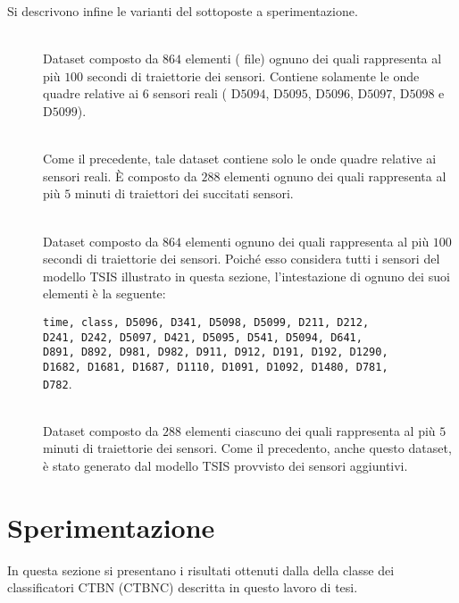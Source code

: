 Si descrivono infine le varianti del  sottoposte a sperimentazione.
\begin{description}
	\item[] \hfill \\
	Dataset composto da $864$ elementi (\ie{} file) ognuno dei quali rappresenta al più $100$ secondi di traiettorie dei sensori. Contiene solamente le onde quadre relative ai $6$ sensori reali (\ie{} D$5094$, D$5095$, D$5096$, D$5097$, D$5098$ e D$5099$).
	\item[] \hfill \\
	Come il precedente, tale dataset contiene solo le onde quadre relative ai sensori reali. \`E composto da $288$ elementi ognuno dei quali rappresenta al più $5$ minuti di traiettori dei succitati sensori.
	\item[] \hfill \\
	Dataset composto da $864$ elementi ognuno dei quali rappresenta al più $100$ secondi di traiettorie dei sensori. Poiché esso considera tutti i sensori del modello \acs{TSIS} illustrato in questa sezione, l'intestazione di ognuno dei suoi elementi è la seguente:\par
	\lstinline[]|time, class, D5096, D341, D5098, D5099, D211, D212, |\\\lstinline[]|D241, D242, D5097, D421, D5095, D541, D5094, D641, |\\\lstinline[]|D891, D892, D981, D982, D911, D912, D191, D192, D1290, |\\\lstinline[]|D1682, D1681, D1687, D1110, D1091, D1092, D1480, D781, |\\\lstinline[]|D782|.
	\item[] \hfill \\
	Dataset composto da $288$ elementi ciascuno dei quali rappresenta al più $5$ minuti di traiettorie dei sensori. Come il precedento, anche questo dataset, è stato generato dal modello \acs{TSIS} provvisto dei sensori aggiuntivi.
\end{description}

\cleardoublepage
\section{Sperimentazione}
In questa sezione si presentano i risultati ottenuti dalla  della classe dei classificatori \acs{CTBN} (\acs{CTBNC}) descritta in questo lavoro di tesi.


